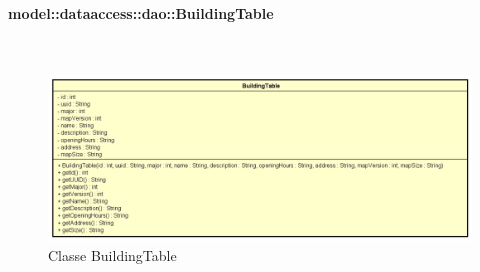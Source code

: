 \documentclass[../DefinizioneDiProdotto.tex]{subfiles}
\begin{document}
\paragraph{model::dataaccess::dao::BuildingTable}
\
\begin{figure}[H]
	\centering
	\includegraphics[width=\maxwidth]{img/BuildingTable.png}
	\caption{Classe BuildingTable}\label{fig:model::dataaccess::dao::BuildingTable} 
\end{figure}
\end{document}

